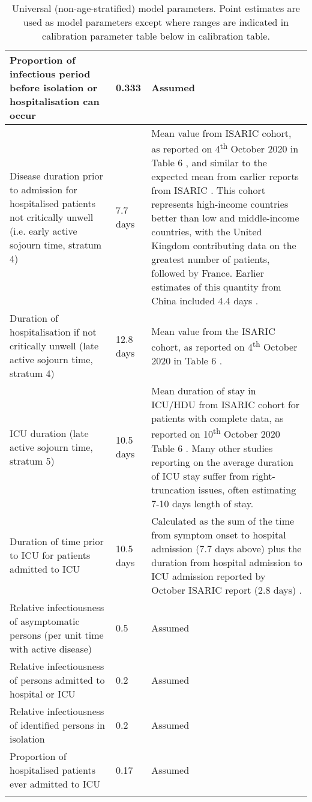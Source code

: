 \begin{longtable}[ht]{| >{\raggedright}p{4cm} | >{\raggedright}p{3cm} | p{6.8cm} |}
    \hline
    Proportion of infectious period before isolation or hospitalisation can occur & 
    0.333 &
    Assumed \\
    \hline
    Disease duration prior to admission for hospitalised patients not critically unwell (i.e. early active sojourn time, stratum 4) &
    7.7 days &
    Mean value from ISARIC cohort, as reported on 4\textsuperscript{th} October 2020 in Table 6 \cite{RN22}, and similar to the expected mean from earlier reports from ISARIC \cite{RN16}. This cohort represents high-income countries better than low and middle-income countries, with the United Kingdom contributing data on the greatest number of patients, followed by France. Earlier estimates of this quantity from China included 4.4 days \cite{RN7}. \\
    \hline
    Duration of hospitalisation if not critically unwell (late active sojourn time, stratum 4) &
    12.8 days &
    Mean value from the ISARIC cohort, as reported on 4\textsuperscript{th} October 2020 in Table 6 \cite{RN22}. \\
    \hline
    ICU duration (late active sojourn time, stratum 5) & 10.5 days &
    Mean duration of stay in ICU/HDU from ISARIC cohort for patients with complete data, as reported on 10\textsuperscript{th} October 2020 Table 6 \cite{RN22}. Many other studies reporting on the average duration of ICU stay suffer from right-truncation issues, often estimating 7-10 days length of stay. \\
    \hline    
    Duration of time prior to ICU for patients admitted to ICU & 
    10.5 days & 
    Calculated as the sum of the time from symptom onset to hospital admission (7.7 days above) plus the duration from hospital admission to ICU admission reported by October ISARIC report (2.8 days) \cite{RN22}. \\
    \hline
    Relative infectiousness of asymptomatic persons (per unit time with active disease) & 0.5 & Assumed \\
    \hline
    Relative infectiousness of persons admitted to hospital or ICU & 0.2 & Assumed \\
    \hline
    Relative infectiousness of identified persons in isolation & 0.2 & Assumed \\
    \hline
    Proportion of hospitalised patients ever admitted to ICU & 0.17 & Assumed \\
    \hline
	\caption{Universal (non-age-stratified) model parameters. Point estimates are used as model parameters except where ranges are indicated in calibration parameter table below in calibration table.}
	\label{tab:params}
\end{longtable}
